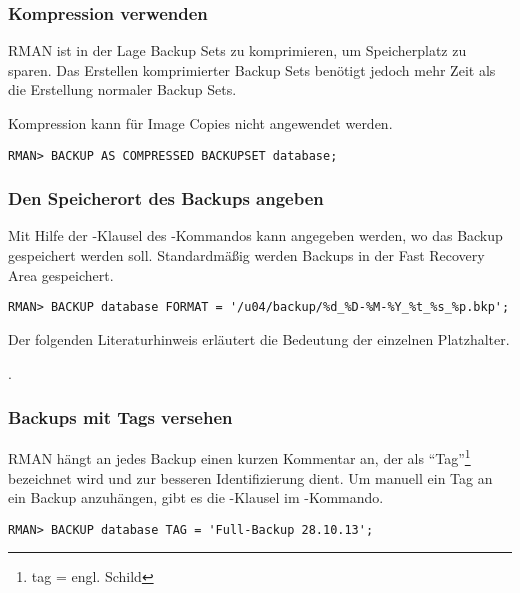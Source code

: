         \subsubsection{Kompression verwenden}
          RMAN ist in der Lage Backup Sets zu komprimieren, um Speicherplatz zu sparen. Das Erstellen komprimierter Backup Sets benötigt jedoch mehr Zeit als die Erstellung normaler Backup Sets.
          \begin{merke}
            Kompression kann für Image Copies nicht angewendet werden.
          \end{merke}
          \begin{lstlisting}[caption={Ein komprimiertes Backup Set der Datenbank erstellen},label=admin1306,language=rman]
RMAN> BACKUP AS COMPRESSED BACKUPSET database;
          \end{lstlisting}
        \subsubsection{Den Speicherort des Backups angeben}
          Mit Hilfe der -Klausel des -Kommandos kann angegeben werden, wo das Backup gespeichert werden soll. Standardmäßig werden Backups in der Fast Recovery Area gespeichert.
          \begin{lstlisting}[caption={Den Speicherort des Backups ändern},label=admin1307,language=rman]
RMAN> BACKUP database FORMAT = '/u04/backup/%d_%D-%M-%Y_%t_%s_%p.bkp';
          \end{lstlisting}
          Der folgenden Literaturhinweis erläutert die Bedeutung der einzelnen Platzhalter.
          \begin{literaturinternet}
            \item \cite[formatSpec]{formatSpec}.
          \end{literaturinternet}
      \subsubsection{Backups mit Tags versehen}
          RMAN hängt an jedes Backup einen kurzen Kommentar an, der als \enquote{Tag}\footnote{tag = engl. Schild} bezeichnet wird und zur besseren Identifizierung dient. Um manuell ein Tag an ein Backup anzuhängen, gibt es die -Klausel im -Kommando.
          \begin{lstlisting}[caption={Ein Backup mit manuellem Tag versehen},label=admin1308,language=rman]
RMAN> BACKUP database TAG = 'Full-Backup 28.10.13';
          \end{lstlisting}
